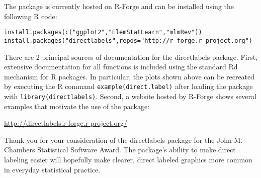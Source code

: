 \documentclass[12pt]{article}
\begin{document}
The package is currently hosted on R-Forge and can be installed
using the following R code:

\begin{verbatim}
install.packages(c("ggplot2","ElemStatLearn","mlmRev"))
install.packages("directlabels",repos="http://r-forge.r-project.org")
\end{verbatim}

There are 2 principal sources of documentation for the directlabels
package. First, extensive documentation for all functions is included
using the standard Rd mechanism for R packages. In particular, the
plots shown above can be recreated by executing the R command
\texttt{example(direct.label)} after loading the package with
\texttt{library(directlabels)}. Second, a website hosted by R-Forge
shows several examples that motivate the use of the package:

\url{http://directlabels.r-forge.r-project.org/}

Thank you for your consideration of the directlabels package for the
John M. Chambers Statistical Software Award. The package's ability to
make direct labeling easier will hopefully make clearer, direct
labeled graphics more common in everyday statistical practice.
\end{document}
